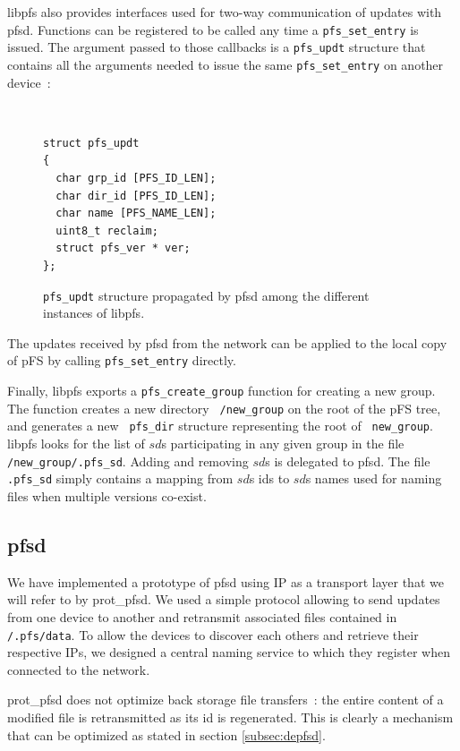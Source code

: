 libpfs also provides interfaces used for two-way communication of
updates with pfsd. Functions can be registered to be called
any time a {\tt pfs\_set\_entry} is issued. The argument passed to
those callbacks is a {\tt pfs\_updt} structure that contains all the
arguments needed to issue the same {\tt pfs\_set\_entry} on another
device~:

\begin{figure}[ht]
\begin{center}
{\tt \small
\begin{verbatim}
struct pfs_updt
{
  char grp_id [PFS_ID_LEN];
  char dir_id [PFS_ID_LEN];  
  char name [PFS_NAME_LEN];
  uint8_t reclaim;
  struct pfs_ver * ver;
};
\end{verbatim}
}
\end{center}
\caption{\label{MemStruct}
{\small {\tt pfs\_updt} structure propagated by pfsd among the
    different instances of libpfs.}}
\end{figure}

The updates received by pfsd from the network can be applied to the
local copy of pFS by calling {\tt pfs\_set\_entry} directly.

Finally, libpfs exports a {\tt pfs\_create\_group} function for
creating a new group. The function creates a new directory {\tt
  /new\_group} on the root of the pFS tree, and generates a new {\tt
  pfs\_dir} structure representing the root of {\tt
  new\_group}. libpfs looks for the list of $sd$s participating in any
given group in the file {\tt /new\_group/.pfs\_sd}. Adding and
removing $sd$s is delegated to pfsd. The file {\tt .pfs\_sd} simply
contains a mapping from $sd$s ids to $sd$s names used for naming files
when multiple versions co-exist.

\subsection {pfsd}

We have implemented a prototype of pfsd using IP as a transport layer
that we will refer to by prot\_pfsd. We used a simple protocol allowing
to send updates from one device to another and retransmit associated
files contained in {\tt /.pfs/data}. To allow the devices to discover
each others and retrieve their respective IPs, we designed a central
naming service to which they register when connected to the network.

prot\_pfsd does not optimize back storage file transfers~: the entire
content of a modified file is retransmitted as its id is
regenerated. This is clearly a mechanism that can be optimized as
stated in section \ref{subsec:depfsd}.

